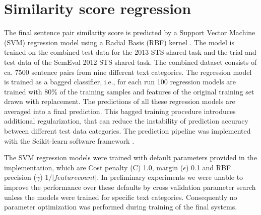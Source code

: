 
\section{Similarity score regression}
\label{sec:regression}

The final sentence pair similarity score is predicted by a Support Vector Machine (SVM) regression model using a Radial Basis (RBF) kernel \cite{VapnikEA:97}. The model is trained on the combined test data for the 2013 STS shared task and the trial and test data of the SemEval 2012 STS shared task. The combined dataset consists of ca. 7500 sentence pairs from nine different text categories. The regression model is trained as a bagged classifier, i.e., for each run 100 regression models are trained with 80\% of the training samples and features of the original training set drawn with replacement. The predictions of all these regression models are averaged into a final prediction. This bagged training procedure introduces additional regularization, that can reduce the instability of prediction accuracy between different test data categories. The prediction pipeline was implemented with the Scikit-learn software framework \cite{scikit-learn}.

The SVM regression models were trained with default parameters provided in the implementation, which are Cost penalty (C) 1.0, margin ($\epsilon$) 0.1 and RBF precision ($\gamma$) $1/|feature count|$. In preliminary experiments we were unable to improve the performance over these defaults by cross validation parameter search unless the models were trained for specific text categories. Consequently no parameter optimization was performed during training of the final systems.

